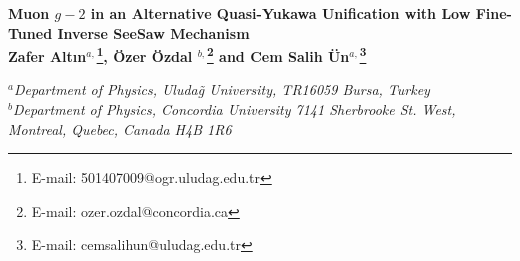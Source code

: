 \documentclass[12pt]{article}
\begin{document}
\begin{titlepage}
\pagestyle{empty}


\vspace*{0.2in}
\begin{center}
{\Large \bf  Muon $g-2$ in an Alternative Quasi-Yukawa Unification with Low Fine-Tuned Inverse SeeSaw Mechanism
  }\\  
\vspace{1cm}
{\bf  Zafer Alt\i n$^{a,}$\footnote{E-mail: 501407009@ogr.uludag.edu.tr}, \"{O}zer \"{O}zdal $^{b,}$\footnote{E-mail: ozer.ozdal@concordia.ca} and
Cem Salih \"{U}n$^{a,}$\footnote{E-mail: cemsalihun@uludag.edu.tr}}
\vspace{0.5cm}

{\it $^a$Department of Physics, Uluda\~{g} University, TR16059 Bursa, Turkey \\
{\it $^b$Department of Physics, Concordia University 7141 Sherbrooke St. West, Montreal, Quebec, Canada H4B 1R6}
}

\end{center}



\vspace{0.5cm}
\begin{abstract}
\noindent
We explore the low scale implications of the Pati-Salam Model including the TeV scale right-handed neutrinos interacting and mixing with the MSSM fields through the inverse seesaw (IS) mechanism in the light of the muon anomalous magnetic moment (muon $g-2$) resolution, and highlight the solutions which are compatible with the Quasi-Yukawa Unification condition (QYU). We find that the presence of the right-handed neutrinos causes heavy smuons as $m_{\tilde{\mu}} \gtrsim 800$ GeV in order to avoid tachyonic staus at the low scale. On the other hand, the sneutrinos can be as light as about 100 GeV along with the light charginos of mass $\lesssim 400$ GeV, they can yield so large contributions to muon $g-2$ that the discrepancy between the experiment and the theory can be resolved. In addition, the model predicts relatively light Higgsinos ($\mu \lesssim 700$ GeV); and hence the second chargino mass is also light enough ($\lesssim 700$ GeV) to contribute to muon $g-2$. Light Higgsinos also yield less fine-tuning at the electroweak scale, and the regions compatible with muon $g-2$ restricts $\Delta_{EW}\lesssim 100$ strictly, and this region also satisfies the QYU condition. In addition, the ratios among the Yukawa couplings should be $1.8 \lesssim y_{t}/y_{b} \lesssim 2.6$, $y_{\tau}/y_{b}\sim 1.3 $ to yield correct fermion masses. Even though the right-handed neutrino Yukawa coupling can be varied freely, the solutions bound its range to $0.8\lesssim y_{\nu}/y_{b} \lesssim 1.7$. 

\end{abstract}

\end{titlepage}
\end{document}

